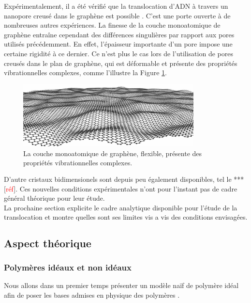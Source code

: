 \documentclass[a4paper,11pt]{article}
\begin{document}
Expérimentalement, il a été vérifié que la translocation d'ADN à travers un nanopore creusé dans le graphène est possible \cite{dnatrans}. C'est une porte ouverte à de nombreuses autres expériences. La finesse de la couche monoatomique de graphène entraîne cependant des différences singulières par rapport aux pores utilisés précédemment. En effet, l'épaisseur importante d'un pore impose une certaine rigidité à ce dernier. Ce n'est plus le cas lors de l'utilisation de pores creusés dans le plan de graphène, qui est déformable et présente des propriétés vibrationnelles complexes, comme l'illustre la Figure \ref{vib}.


\begin{figure}[H]
\begin{center}
\includegraphics[width=0.83\textwidth]{vib.jpg} 
\caption{La couche monoatomique de graphène, flexible, présente des propriétés vibrationnelles complexes.}
\label{vib}
\end{center}
\end{figure}

D'autre cristaux bidimensionels sont depuis peu également disponibles, tel le *** [\textcolor{red}{réf}]. Ces nouvelles conditions expérimentales n'ont pour l'instant pas de cadre général théorique pour leur étude.\\

La prochaine section explicite le cadre analytique disponible pour l'étude de la translocation et montre quelles sont ses limites vis a vis des conditions  envisagées.


\newpage

\subsection{Aspect théorique}


\subsubsection{Polymères idéaux et non idéaux}
Nous allons dans un premier temps présenter un modèle naïf de polymère idéal afin de poser les bases admises en physique des polymères \cite{sung,these}.\\
\end{document}
